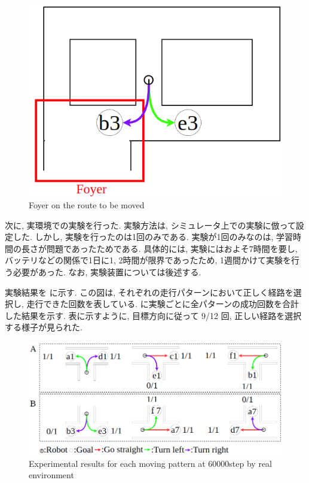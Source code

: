 \begin{figure}[hbtp]
  \centering
 \includegraphics[keepaspectratio, scale=0.4]
      {images/howaie2.png}
 \caption{Foyer on the route to be moved}
 \label{Fig:howaie}
\end{figure}

次に, 実環境での実験を行った. 実験方法は, シミュレータ上での実験に倣って設定した. しかし, 実験を行ったのは1回のみである. 実験が1回のみなのは, 学習時間の長さが問題であったためである. 具体的には, 実験にはおよそ7時間を要し, バッテリなどの関係で1日に1, 2時間が限界であったため, 1週間かけて実験を行う必要があった. なお, 実験装置については後述する.

実験結果を  に示す. この図は, それぞれの走行パターンにおいて正しく経路を選択し, 走行できた回数を表している.  に実験ごとに全パターンの成功回数を合計した結果を示す. 表に示すように, 目標方向に従って 9/12 回, 正しい経路を選択する様子が見られた.

\begin{figure}[hbtp]
  \centering
 \includegraphics[keepaspectratio, scale=0.4]
      {images/60000step_real2.png}
 \caption{Experimental results for each moving pattern at 60000step by real environment}
 \label{Fig:60000step_real}
\end{figure}

